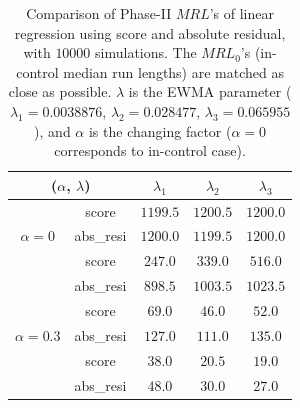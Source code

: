 \documentclass[twoside,11pt]{article}
\begin{document}
\begin{table}[!t]
\centering
\begin{tabular}{ccccc}
\toprule
\multicolumn{2}{c}{($ \alpha$, $ \lambda$)} & {$ \lambda_1$} & {$ \lambda_2$} & {$ \lambda_3$} \\
\midrule
\multirow{3}{*}{$ \alpha=0$} & score &$1199.5$ & $1200.5$ & $1200.0$ \\
& abs\_resi &$1200.0$ & $1199.5$ & $1200.0$ \\
\midrule
\multirow{3}{*}{$\alpha=0.1$} & score &$\bm{247.0}$ & $\bm{339.0}$ & $\bm{516.0}$ \\
& abs\_resi &$898.5$ & $1003.5$ & $1023.5$ \\
\midrule
\multirow{3}{*}{$\alpha=0.3$} & score &$\bm{69.0}$ & $\bm{46.0}$ & $\bm{52.0}$ \\
& abs\_resi &$127.0$ & $111.0$ & $135.0$ \\
\midrule
\multirow{3}{*}{$\alpha=0.5$} & score &$\bm{38.0}$ & $\bm{20.5}$ & $\bm{19.0}$ \\
& abs\_resi &$48.0$ & $30.0$ & $27.0$ \\
\midrule
\end{tabular}
\caption{Comparison of Phase-II $MRL$'s of linear regression using score and absolute residual, with $10000$ simulations. The $MRL_0$'s (in-control median run lengths) are matched as close as possible. $ \lambda$ is the EWMA parameter ( {$ \lambda_1 = 0.0038876$}, {$ \lambda_2 = 0.028477$}, {$ \lambda_3 =0.065955$}), and $ \alpha$ is the changing factor ($ \alpha=0$ corresponds to in-control case).}
\label{tab:lin_MRL}
\end{table}
\end{document}
